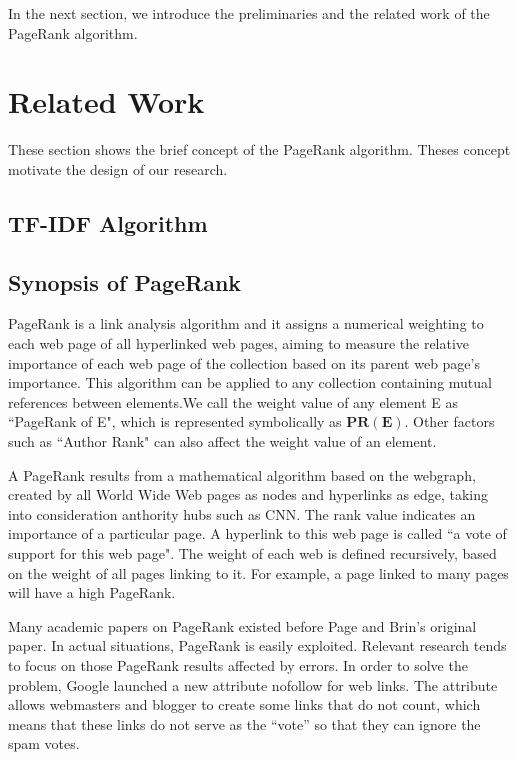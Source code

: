 \documentclass[lettersize,journal,12pt]{IEEEtran}
\begin{document}
In the next section, we introduce the preliminaries and the related work of the PageRank algorithm.

\section{Related Work}

These section shows the brief concept of the PageRank algorithm. Theses concept motivate the design of our research.

\subsection{TF-IDF Algorithm}


\subsection{Synopsis of PageRank}

PageRank is a link analysis algorithm and it assigns a numerical weighting to each web page of all hyperlinked web pages, aiming to measure the relative importance of each web page of the collection based on its parent web page's importance. This algorithm can be applied to any collection containing mutual references between elements.We call the weight value of any element E as ``PageRank of E", which is represented symbolically as $\boldsymbol{PR(E)}$. Other factors such as ``Author Rank" can also affect the weight value of an element.

A PageRank results from a mathematical algorithm based on the webgraph, created by all World Wide Web pages as nodes and hyperlinks as edge, taking into consideration anthority hubs such as CNN. The rank value indicates an importance of a particular page. A hyperlink to this web page is called ``a vote of support for this web page". The weight of each web is defined recursively, based on the weight of all pages linking to it. For example, a page linked to many pages will have a high PageRank.

Many academic papers on PageRank existed before Page and Brin's original paper. In actual situations, PageRank is easily exploited. Relevant research tends to focus on those PageRank results affected by errors. In order to solve the problem, Google launched a new attribute nofollow for web links. The attribute allows webmasters and blogger to create some links that do not count, which means that these links do not serve as the ``vote'' so that they can ignore the spam votes.
\end{document}
